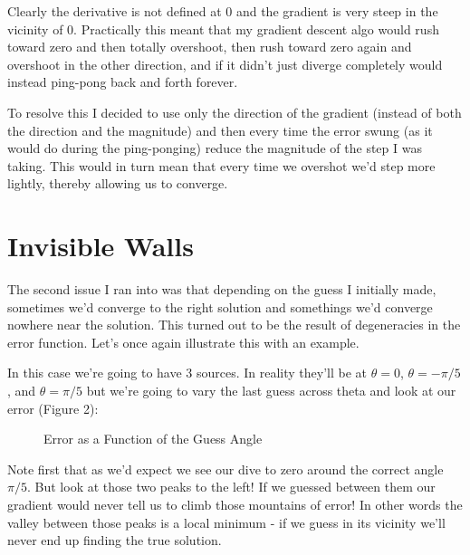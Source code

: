 \documentclass[10pt,a5paper]{book}
\begin{document}
Clearly the derivative is not defined at 0 and the gradient is very steep in the vicinity of 0. Practically this meant that my gradient descent algo would rush toward zero and then totally overshoot, then rush toward zero again and overshoot in the other direction, and if it didn't just diverge completely would instead ping-pong back and forth forever. 

To resolve this I decided to use only the direction of the gradient (instead of both the direction and the magnitude) and then every time the error swung (as it would do during the ping-ponging) reduce the magnitude of the step I was taking. This would in turn mean that every time we overshot we'd step more lightly, thereby allowing us to converge. 

\section{Invisible Walls}
The second issue I ran into was that depending on the guess I initially made, sometimes we'd converge to the right solution and somethings we'd converge nowhere near the solution. This turned out to be the result of degeneracies in the error function. Let's once again illustrate this with an example.

In this case we're going to have 3 sources. In reality they'll be at $\theta=0$, $\theta=-\pi/5$, and $\theta=\pi/5$ but we're going to vary the last guess across theta and look at our error (Figure 2):

\begin{figure}[!htb]
\caption{\label{fig:my-label} Error as a Function of the Guess Angle}
\end{figure}

Note first that as we'd expect we see our dive to zero around the correct angle $\pi/5$. But look at those two peaks to the left! If we guessed between them our gradient would never tell us to climb those mountains of error! In other words the valley between those peaks is a local minimum - if we guess in its vicinity we'll never end up finding the true solution. 
\end{document}
